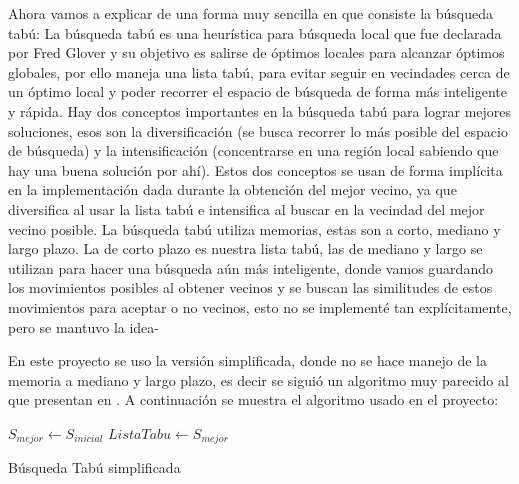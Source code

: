 \documentclass{article}
\begin{document}
Ahora vamos a explicar de una forma muy sencilla en que consiste la búsqueda tabú:
La búsqueda tabú es una heurística para búsqueda local que fue declarada por Fred Glover \cite{tabuglover} y su objetivo es salirse de óptimos locales para alcanzar óptimos globales, por ello maneja una lista tabú, para evitar seguir en vecindades cerca de un óptimo local y poder recorrer el espacio de búsqueda de forma más inteligente y rápida. Hay dos conceptos importantes en la búsqueda tabú para lograr mejores soluciones, esos son la diversificación (se busca recorrer lo más posible del espacio de búsqueda) y la intensificación (concentrarse en una región local sabiendo que hay una buena solución por ahí). Estos dos conceptos se usan  de forma implícita en la implementación dada durante la obtención del mejor vecino, ya que diversifica al usar la lista tabú e intensifica al buscar en la vecindad del mejor vecino posible. La búsqueda tabú utiliza memorias, estas son a corto, mediano y largo plazo. La de corto plazo es nuestra lista tabú, las de mediano y largo se utilizan para hacer una búsqueda aún más inteligente, donde vamos guardando los movimientos posibles al obtener vecinos y se buscan las similitudes de estos movimientos para aceptar o no vecinos, esto no se implementé tan explícitamente, pero se mantuvo la idea-

En este proyecto se uso la versión simplificada, donde no se hace manejo de la memoria a mediano y largo plazo, es decir se siguió un algoritmo muy parecido al que presentan en \cite{clever}. A continuación se muestra el algoritmo usado en el proyecto:

\begin{algorithm}[H]
	\SetAlgoLined
	$S_{mejor} \leftarrow S_{inicial}$
	$ListaTabu \leftarrow S_{mejor}$
	\caption{Búsqueda Tabú simplificada}
\end{algorithm}
\end{document}
